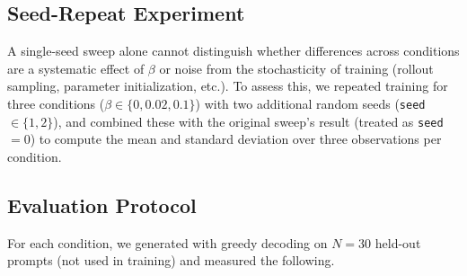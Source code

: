 \documentclass[conference]{IEEEtran}
\begin{document}
\subsection{Seed-Repeat Experiment}
\label{sec:seedrepeat}

A single-seed sweep alone cannot distinguish whether differences
across conditions are a systematic effect of $\beta$ or noise from the
stochasticity of training (rollout sampling, parameter
initialization, etc.). To assess this, we repeated training for three
conditions ($\beta \in \{0, 0.02, 0.1\}$) with two additional random
seeds (\texttt{seed}$\in\{1,2\}$), and combined these with the
original sweep's result (treated as \texttt{seed}$=0$) to compute the
mean and standard deviation over three observations per condition.

\subsection{Evaluation Protocol}

For each condition, we generated with greedy decoding on $N{=}30$
held-out prompts (not used in training) and measured the following.
\end{document}
